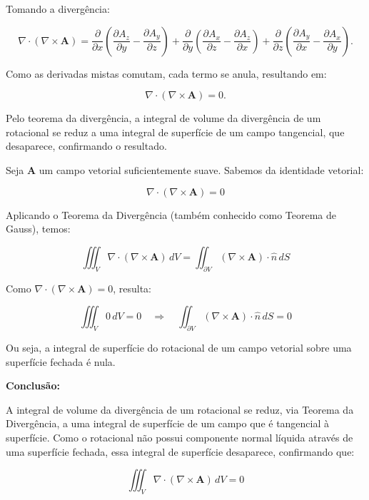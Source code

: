 \documentclass[a4paper,12pt]{article}
\begin{document}
Tomando a divergência:

\begin{equation}
    \nabla \cdot (\nabla \times \mathbf{A}) = \frac{\partial}{\partial x} \left( \frac{\partial A_z}{\partial y} - \frac{\partial A_y}{\partial z} \right) + 
    \frac{\partial}{\partial y} \left( \frac{\partial A_x}{\partial z} - \frac{\partial A_z}{\partial x} \right) + 
    \frac{\partial}{\partial z} \left( \frac{\partial A_y}{\partial x} - \frac{\partial A_x}{\partial y} \right).
\end{equation}

Como as derivadas mistas comutam, cada termo se anula, resultando em:

\begin{equation}
\boxed{\nabla \cdot (\nabla \times \mathbf{A}) = 0.}
\end{equation}

Pelo teorema da divergência, a integral de volume da divergência de um rotacional se reduz a uma integral de superfície 
de um campo tangencial, que desaparece, confirmando o resultado.

Seja \(\mathbf{A}\) um campo vetorial suficientemente suave. Sabemos da identidade vetorial:

\[
\nabla \cdot (\nabla \times \mathbf{A}) = 0
\]

Aplicando o Teorema da Divergência (também conhecido como Teorema de Gauss), temos:

\[
\iiint_V \nabla \cdot (\nabla \times \mathbf{A}) \, dV = \iint_{\partial V} (\nabla \times \mathbf{A}) \cdot \hat{n} \, dS
\]

Como \(\nabla \cdot (\nabla \times \mathbf{A}) = 0\), resulta:

\[
\iiint_V 0 \, dV = 0
\quad \Rightarrow \quad
\iint_{\partial V} (\nabla \times \mathbf{A}) \cdot \hat{n} \, dS = 0
\]

Ou seja, a integral de superfície do rotacional de um campo vetorial 
sobre uma superfície fechada é nula.

\bigskip

\textbf{Conclusão:}

A integral de volume da divergência de um rotacional se reduz, via Teorema da Divergência, a uma integral de superfície de um campo que é tangencial à superfície. Como o rotacional não possui componente normal líquida através de uma superfície fechada, essa integral de superfície desaparece, confirmando que:

\[
\iiint_V \nabla \cdot (\nabla \times \mathbf{A}) \, dV = 0
\]
\end{document}
